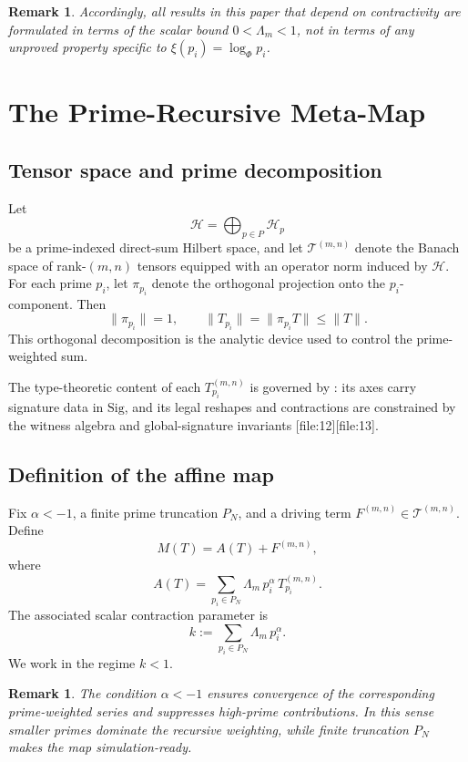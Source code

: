 \documentclass[11pt,a4paper]{article}
\newtheorem{remark}[theorem]{Remark}
\newcommand{\Sig}{\mathrm{Sig}}
\newcommand{\Hilb}{\mathcal{H}}
\newcommand{\Tensor}{\mathcal{T}}
\newcommand{\PETC}{\mathrm{PETC}}
\begin{document}
\begin{remark}
Accordingly, all results in this paper that depend on contractivity are formulated in terms of the scalar bound \(0<\Lambda_m<1\), not in terms of any unproved property specific to \(\xi(p_i)=\log_{\Phi}p_i\).
\end{remark}
\newpage
\section{The Prime-Recursive Meta-Map}

\subsection{Tensor space and prime decomposition}

Let
\[
\Hilb = \bigoplus_{p\in P}\Hilb_p
\]
be a prime-indexed direct-sum Hilbert space, and let \(\Tensor^{(m,n)}\) denote the Banach space of rank-\((m,n)\) tensors equipped with an operator norm induced by \(\Hilb\). For each prime \(p_i\), let \(\pi_{p_i}\) denote the orthogonal projection onto the \(p_i\)-component. Then
\[
\|\pi_{p_i}\|=1, \qquad \|T_{p_i}\|=\|\pi_{p_i}T\|\le \|T\|.
\]
This orthogonal decomposition is the analytic device used to control the prime-weighted sum.

The type-theoretic content of each \(T_{p_i}^{(m,n)}\) is governed by \PETC: its axes carry signature data in \(\Sig\), and its legal reshapes and contractions are constrained by the witness algebra and global-signature invariants [file:12][file:13].

\subsection{Definition of the affine map}

Fix \(\alpha < -1\), a finite prime truncation \(P_N\), and a driving term \(F^{(m,n)}\in \Tensor^{(m,n)}\). Define
\[
M(T)
=
A(T)+F^{(m,n)},
\]
where
\[
A(T)
=
\sum_{p_i\in P_N}\Lambda_m\, p_i^\alpha\, T_{p_i}^{(m,n)}.
\]
The associated scalar contraction parameter is
\[
k:=\sum_{p_i\in P_N}\Lambda_m\, p_i^\alpha.
\]
We work in the regime \(k<1\).

\begin{remark}
The condition \(\alpha<-1\) ensures convergence of the corresponding prime-weighted series and suppresses high-prime contributions. In this sense smaller primes dominate the recursive weighting, while finite truncation \(P_N\) makes the map simulation-ready.
\end{remark}
\end{document}
